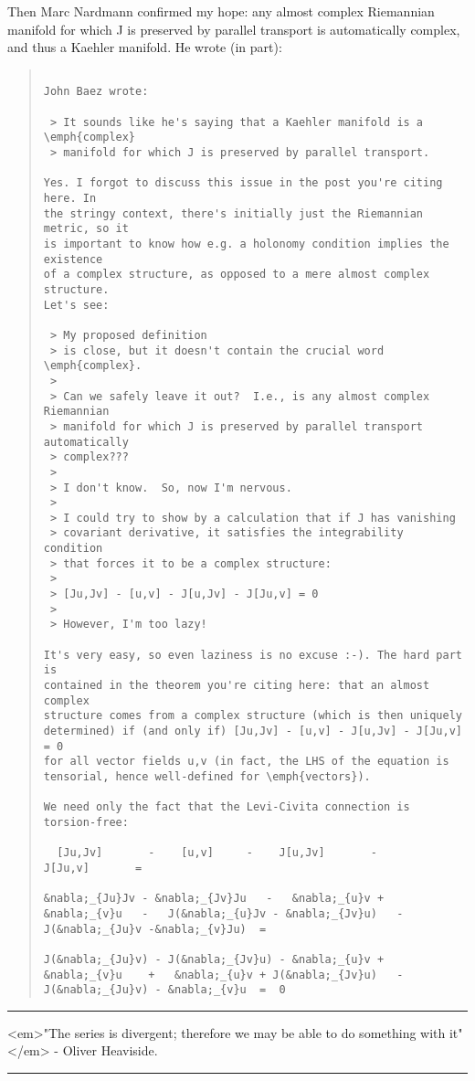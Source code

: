 Then Marc Nardmann confirmed my hope: any almost complex Riemannian
manifold for which J is preserved by parallel transport is
automatically complex, and thus a Kaehler manifold.  He wrote
(in part):

\begin{quote}

\begin{verbatim}

John Baez wrote:

 > It sounds like he's saying that a Kaehler manifold is a \emph{complex}
 > manifold for which J is preserved by parallel transport.

Yes. I forgot to discuss this issue in the post you're citing here. In
the stringy context, there's initially just the Riemannian metric, so it
is important to know how e.g. a holonomy condition implies the existence
of a complex structure, as opposed to a mere almost complex structure.
Let's see:

 > My proposed definition
 > is close, but it doesn't contain the crucial word \emph{complex}.
 >
 > Can we safely leave it out?  I.e., is any almost complex Riemannian
 > manifold for which J is preserved by parallel transport automatically
 > complex???
 >
 > I don't know.  So, now I'm nervous.
 >
 > I could try to show by a calculation that if J has vanishing
 > covariant derivative, it satisfies the integrability condition
 > that forces it to be a complex structure:
 >
 > [Ju,Jv] - [u,v] - J[u,Jv] - J[Ju,v] = 0
 >
 > However, I'm too lazy!

It's very easy, so even laziness is no excuse :-). The hard part is
contained in the theorem you're citing here: that an almost complex
structure comes from a complex structure (which is then uniquely
determined) if (and only if) [Ju,Jv] - [u,v] - J[u,Jv] - J[Ju,v] = 0
for all vector fields u,v (in fact, the LHS of the equation is
tensorial, hence well-defined for \emph{vectors}).

We need only the fact that the Levi-Civita connection is torsion-free:

  [Ju,Jv]       -    [u,v]     -    J[u,Jv]       -       J[Ju,v]       = 

&nabla;_{Ju}Jv - &nabla;_{Jv}Ju   -   &nabla;_{u}v + &nabla;_{v}u   -   J(&nabla;_{u}Jv - &nabla;_{Jv}u)   -   J(&nabla;_{Ju}v -&nabla;_{v}Ju)  =

J(&nabla;_{Ju}v) - J(&nabla;_{Jv}u) - &nabla;_{u}v + &nabla;_{v}u    +   &nabla;_{u}v + J(&nabla;_{Jv}u)   -   J(&nabla;_{Ju}v) - &nabla;_{v}u  =  0
\end{verbatim}
    
\end{quote}




\par\noindent\rule{\textwidth}{0.4pt}
<em>"The series is divergent; therefore we may be able to
do something with it"</em> - Oliver Heaviside.  
\par\noindent\rule{\textwidth}{0.4pt}

